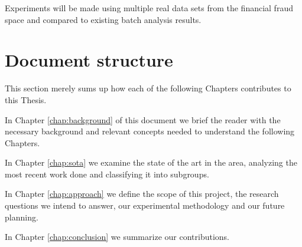 Experiments will be made using multiple real data sets from the financial fraud space and compared to existing batch analysis results.

\section{Document structure}
This section merely sums up how each of the following Chapters contributes to this Thesis.

In Chapter \ref{chap:background} of this document we brief the reader with the necessary background and relevant concepts needed to understand the following Chapters.

In Chapter \ref{chap:sota} we examine the state of the art in the area, analyzing the most recent work done and classifying it into subgroups.

In Chapter \ref{chap:approach} we define the scope of this project, the research questions we intend to answer, our experimental methodology and our future planning.

In Chapter \ref{chap:conclusion} we summarize our contributions.